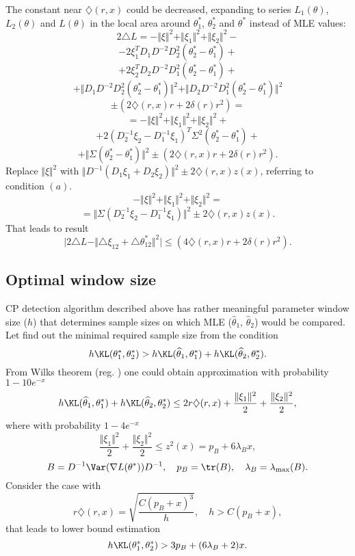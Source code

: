 \begin{remark}
 The constant near  $\diamondsuit (r, x)$ could be decreased,  expanding to series $L_1(\theta)$, $L_2(\theta)$ and $L(\theta)$ in the local area  around $\theta_1^*$, $\theta_2^*$ and $\theta^*$ instead of MLE values:
\[
2 \triangle L = - \Vert \xi \Vert^2 + \Vert \xi_1 \Vert^2 + \Vert \xi_2 \Vert^2   - 
\]
\[
-2 \xi_1^T D_1 D^{-2} D_2^2 (\theta_2^* - \theta_1^*) + 
\]
\[
+ 2 \xi_2^T D_2 D^{-2} D_1^2 (\theta_2^* - \theta_1^*)+
\]
\[ + \Vert  D_1 D^{-2} D_2^2 (\theta_2^* - \theta_1^* )\Vert^2 + \Vert  D_2 D^{-2} D_1^2 (\theta_2^* - \theta_1^*) \Vert^2 
\]
\[
\pm (2 \diamondsuit (r, x) r + 2 \delta(r) r^2) =
\]
\[
= - \Vert \xi \Vert^2 + \Vert \xi_1 \Vert^2 + \Vert \xi_2 \Vert^2   + 
\]
\[
+2(D_2^{-1} \xi_2 - D_1^{-1} \xi_1)^T \Sigma^2 (\theta_2^* - \theta_1^*) + \]
\[
+\Vert \Sigma (\theta_2^* - \theta_1^*) \Vert^2 \pm (2 \diamondsuit (r, x) r + 2 \delta(r) r^2).
\]
Replace $\Vert \xi \Vert^2$ with $\Vert D^{-1}(D_1 \xi_1 + D_2 \xi_2) \Vert^2 \pm  2\diamondsuit (r, x) z(x) $, referring to condition $(a)$. 
\[
- \Vert \xi \Vert^2 + \Vert \xi_1 \Vert^2 + \Vert \xi_2 \Vert^2  = 
\]
\[
=\Vert \Sigma (D_2^{-1} \xi_2 - D_1^{-1} \xi_1) \Vert^2 \pm  2\diamondsuit (r, x) z(x).
\]
That leads to result
\[
\bigg |
2 \triangle L  -  \Vert \triangle \xi_{12} + \triangle \theta_{12}^* \Vert^2 
\bigg | 
\leq (4 \diamondsuit (r, x) r + 2 \delta(r) r^2).
\]
\end{remark}

\subsection{Optimal window size}
\label{subsec:win_size}
CP detection algorithm described above has rather meaningful parameter window size ($h$) that determines sample sizes on which MLE ($\widehat{\theta}_1$, $\widehat{\theta}_2$) would be compared. Let find out the minimal required sample size from the condition 
\[
h\KL (\theta_1^*, \theta_2^*) > h\KL (\widehat{\theta}_1, \theta_1^*) +
h\KL (\widehat{\theta}_2, \theta_2^*).
\]
From Wilks theorem (reg. \cite{wilks2013}) one could obtain approximation with probability $1-10e^{-x}$ 
\[
h \KL (\widehat{\theta}_1, \theta_1^*) +
h \KL (\widehat{\theta}_2, \theta_2^*) \leq 
2 r \diamondsuit(r,x) + \frac{\Vert \xi_1 \Vert^2}{2} + \frac{\Vert \xi_2 \Vert^2}{2},
\]
where with probability $1-4e^{-x}$
\[
\frac{\Vert \xi_1 \Vert^2}{2} + \frac{\Vert \xi_2 \Vert^2}{2} \leq z^2(x)  = p_B + 6 \lambda_B x,
\]
\[
B = D^{-1} \Var (\nabla L(\theta^*))D^{-1},
\quad p_B = \tr(B), 
\quad \lambda_B  = \lambda_{\max} (B).
\]
Consider the case with 
\[
r \diamondsuit(r,x) = \sqrt{\frac{C(p_B + x)^3}{h}},
\quad h > C(p_B+x),
\]
that leads to lower bound estimation
\[
h \KL (\theta_1^*, \theta_2^*) > 3 p_B + (6 \lambda_B + 2) x.
\]


